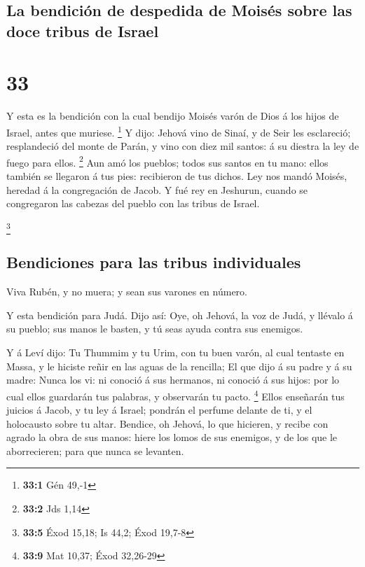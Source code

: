 \hypertarget{la-bendiciuxf3n-de-despedida-de-moisuxe9s-sobre-las-doce-tribus-de-israel}{%
\subsection{La bendición de despedida de Moisés sobre las doce tribus de
Israel}\label{la-bendiciuxf3n-de-despedida-de-moisuxe9s-sobre-las-doce-tribus-de-israel}}

\hypertarget{section-32}{%
\section{33}\label{section-32}}

 Y esta es la bendición con la cual bendijo Moisés varón
de Dios á los hijos de Israel, antes que muriese. \footnote{\textbf{33:1}
  Gén 49,-1}  Y dijo: Jehová vino de Sinaí, y de Seir les
esclareció; resplandeció del monte de Parán, y vino con diez mil santos:
á su diestra la ley de fuego para ellos. \footnote{\textbf{33:2} Jds
  1,14}  Aun amó los pueblos; todos sus santos en tu mano:
ellos también se llegaron á tus pies: recibieron de tus dichos.
 Ley nos mandó Moisés, heredad á la congregación de Jacob.
 Y fué rey en Jeshurun, cuando se congregaron las cabezas
del pueblo con las tribus de Israel.

\footnote{\textbf{33:5} Éxod 15,18; Is 44,2; Éxod 19,7-8}

\hypertarget{bendiciones-para-las-tribus-individuales}{%
\subsection{Bendiciones para las tribus
individuales}\label{bendiciones-para-las-tribus-individuales}}

 Viva Rubén, y no muera; y sean sus varones en número.

 Y esta bendición para Judá. Dijo así: Oye, oh Jehová, la
voz de Judá, y llévalo á su pueblo; sus manos le basten, y tú seas ayuda
contra sus enemigos.

 Y á Leví dijo: Tu Thummim y tu Urim, con tu buen varón,
al cual tentaste en Massa, y le hiciste reñir en las aguas de la
rencilla;  El que dijo á su padre y á su madre: Nunca los
vi: ni conoció á sus hermanos, ni conoció á sus hijos: por lo cual ellos
guardarán tus palabras, y observarán tu pacto. \footnote{\textbf{33:9}
  Mat 10,37; Éxod 32,26-29}  Ellos enseñarán tus juicios
á Jacob, y tu ley á Israel; pondrán el perfume delante de ti, y el
holocausto sobre tu altar.  Bendice, oh Jehová, lo que
hicieren, y recibe con agrado la obra de sus manos: hiere los lomos de
sus enemigos, y de los que le aborrecieren; para que nunca se levanten.

